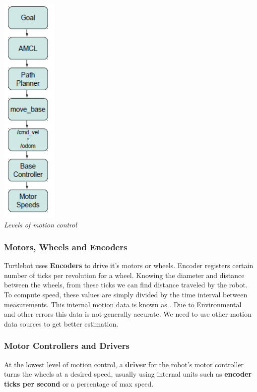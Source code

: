 \documentclass[10pt,a4paper]{article}
\begin{document}
\begin{center}
\includegraphics[width=0.2\textwidth]{images/motion_control.png}\\
\textit{Levels of motion control}
\end{center}

\subsubsection{Motors, Wheels and Encoders}
Turtlebot uses \textbf{Encoders} to drive it's motors or wheels. Encoder registers certain number of ticks per revolution for a wheel. Knowing the diameter and distance between the wheels, from these ticks we can find distance traveled by the robot. To compute speed, these values are simply divided by the time interval between measurements.
This internal motion data is known as . Due to Environmental and other errors this data is not generally accurate. We need to use other motion data sources to get better estimation.

\subsubsection{Motor Controllers and Drivers}
At the lowest level of motion control, a \textbf{driver }for the robot's motor controller turns the wheels at a desired speed, usually using internal units such as \textbf{encoder ticks per second} or a percentage of max speed.
\end{document}
